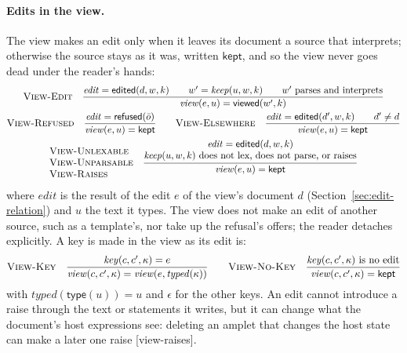 \documentclass[11pt]{article}
\numberwithin{equation}{section}
\newcommand{\kw}[1]{\ensuremath{\mathsf{#1}}}
\newcommand{\rulelabel}[1]{\textsc{#1}}
\begin{document}
\paragraph{Edits in the view.}  The view makes an edit only when it leaves
its document a source that interprets; otherwise the source stays as it
was, written $\kw{kept}$, and so the view never goes dead under the reader's
hands:
\begin{gather}
\label{eq:view-edit}
\rulelabel{View-Edit}\quad
\frac{\mathit{edit} = \kw{edited}(d, w, k) \qquad w' = \mathit{keep}(u, w, k)
      \qquad w' \text{ parses and interprets}}
     {\mathit{view}(e, u) = \kw{viewed}(w', k)}
\\
\rulelabel{View-Refused}\quad
\frac{\mathit{edit} = \kw{refused}(\bar o)}{\mathit{view}(e, u) = \kw{kept}}
\qquad
\rulelabel{View-Elsewhere}\quad
\frac{\mathit{edit} = \kw{edited}(d', w, k) \qquad d' \ne d}{\mathit{view}(e, u) = \kw{kept}}
\\
\begin{array}{@{}l@{}}\rulelabel{View-Unlexable} \\ \rulelabel{View-Unparsable} \\
\rulelabel{View-Raises}\end{array}\quad
\frac{\begin{array}{@{}c@{}}\mathit{edit} = \kw{edited}(d, w, k) \\
      \mathit{keep}(u, w, k) \text{ does not lex, does not parse, or raises}
      \end{array}}
     {\mathit{view}(e, u) = \kw{kept}}
\end{gather}
where $\mathit{edit}$ is the result of the edit $e$ of the view's document
$d$ (Section~\ref{sec:edit-relation}) and $u$ the text it types.  The view
does not make an edit of another source, such as a template's, nor take up
the refusal's offers; the reader detaches explicitly.  A key is made in
the view as its edit is:
\[
\rulelabel{View-Key}\quad
\frac{\mathit{key}(c, c', \kappa) = e}{\mathit{view}(c, c', \kappa) = \mathit{view}(e, \mathit{typed}(\kappa))}
\qquad
\rulelabel{View-No-Key}\quad
\frac{\mathit{key}(c, c', \kappa) \text{ is no edit}}{\mathit{view}(c, c', \kappa) = \kw{kept}}
\]
with $\mathit{typed}(\kw{type}(u)) = u$ and $\epsilon$ for the other keys.
An edit cannot introduce a raise through the text or statements it writes,
but it can change what the document's host expressions see: deleting an
amplet that changes the host state can make a later one raise
[view-raises].
\end{document}
